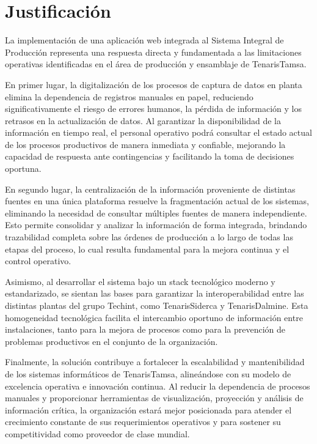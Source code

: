 \section{Justificación}

La implementación de una aplicación web integrada al Sistema Integral de Producción representa una respuesta directa y fundamentada a las limitaciones operativas identificadas en el área de producción y ensamblaje de TenarisTamsa.

En primer lugar, la digitalización de los procesos de captura de datos en planta elimina la dependencia de registros manuales en papel, reduciendo significativamente el riesgo de errores humanos, la pérdida de información y los retrasos en la actualización de datos. Al garantizar la disponibilidad de la información en tiempo real, el personal operativo podrá consultar el estado actual de los procesos productivos de manera inmediata y confiable, mejorando la capacidad de respuesta ante contingencias y facilitando la toma de decisiones oportuna.

En segundo lugar, la centralización de la información proveniente de distintas fuentes en una única plataforma resuelve la fragmentación actual de los sistemas, eliminando la necesidad de consultar múltiples fuentes de manera independiente. Esto permite consolidar y analizar la información de forma integrada, brindando trazabilidad completa sobre las órdenes de producción a lo largo de todas las etapas del proceso, lo cual resulta fundamental para la mejora continua y el control operativo.

Asimismo, al desarrollar el sistema bajo un stack tecnológico moderno y estandarizado, se sientan las bases para garantizar la interoperabilidad entre las distintas plantas del grupo Techint, como TenarisSiderca y TenarisDalmine. Esta homogeneidad tecnológica facilita el intercambio oportuno de información entre instalaciones, tanto para la mejora de procesos como para la prevención de problemas productivos en el conjunto de la organización.

Finalmente, la solución contribuye a fortalecer la escalabilidad y mantenibilidad de los sistemas informáticos de TenarisTamsa, alineándose con su modelo de excelencia operativa e innovación continua. Al reducir la dependencia de procesos manuales y proporcionar herramientas de visualización, proyección y análisis de información crítica, la organización estará mejor posicionada para atender el crecimiento constante de sus requerimientos operativos y para sostener su competitividad como proveedor de clase mundial.